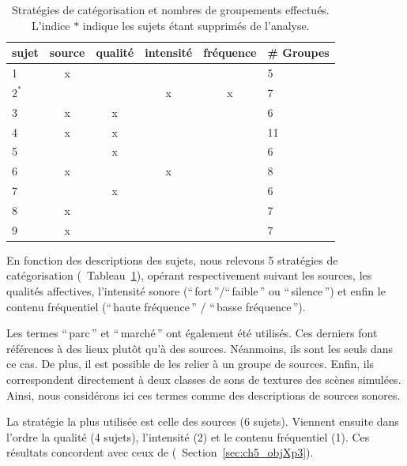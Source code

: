 \begin{table}[t]
\centering
\begin{tabular}{l|cccc|l} 
sujet    & source & qualité & intensité & fréquence & \# Groupes \\
\hline
    1    &   x    &         &        &           & 5  \\
    $2^*$&        &         &    x   &     x     & 7  \\
    3    &   x    &    x    &        &           & 6  \\
    4    &   x    &    x    &        &           & 11 \\        
    5    &        &    x    &        &           & 6  \\
    6    &   x    &         &    x   &           & 8  \\
    7    &        &    x    &        &           & 6  \\
    8    &   x    &         &        &           & 7  \\
    9    &   x    &         &        &           & 7  \\
\hline
\end{tabular}
\vspace{0.5mm}
\caption[Stratégies de catégorisation et nombres de groupements effectués]{Stratégies de catégorisation et nombres de groupements effectués. L'indice $*$ indique les sujets étant supprimés de l'analyse.}
\label{tab:StratSate}
\end{table}

En fonction des descriptions des sujets, nous relevons 5 stratégies de catégorisation (\cf~Tableau~\ref{tab:StratSate}), opérant respectivement suivant les sources, les qualités affectives, l'intensité sonore (``\,fort\,''/``\,faible\,'' ou ``\,silence\,'') et enfin le contenu fréquentiel (``\,haute fréquence\,'' / ``\,basse fréquence\,''). 

Les termes ``\,parc\,'' et ``\,marché\,'' ont également été utilisés. Ces derniers font références à des lieux plutôt qu'à des sources. Néanmoins, ils sont les seuls dans ce cas. De plus, il est possible de les relier à un groupe de sources. Enfin, ils correspondent directement à deux classes de sons de textures des scènes simulées. Ainsi, nous considérons ici ces termes comme des descriptions de sources sonores.

La stratégie la plus utilisée est celle des sources (6 sujets). Viennent ensuite dans l'ordre la qualité (4 sujets), l'intensité (2) et le contenu fréquentiel (1). Ces résultats concordent avec ceux de \cite{maffiolo_caracterisation_1999} (\cf~Section~\ref{sec:ch5_objXp3}).

